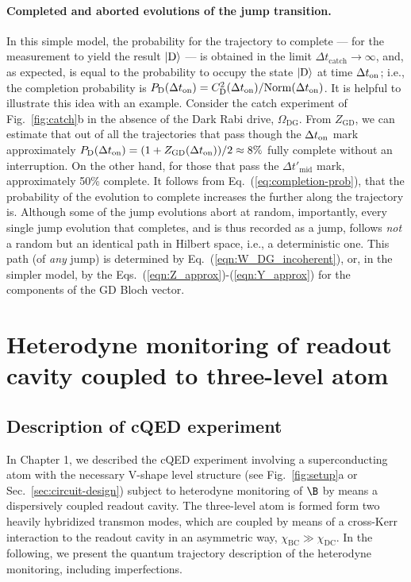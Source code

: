 \paragraph{Completed and aborted evolutions of the jump transition.}

In this simple model, the probability for the trajectory to complete
— for the measurement to yield the result $|{\rm D}\rangle$ — is
obtained in the limit $\Delta t_{\mathrm{catch}}\rightarrow\infty$,
and, as expected, is equal to the probability to occupy the state
$|{\rm D}\rangle$ at time $\Delta t_{{\rm on}}$; i.e., the completion
probability is $P_{\mathrm{D}}(\Delta t_{{\rm on}})=C_{{\rm D}}^{2}(\Delta t_{{\rm on}})/{{\rm Norm}(\Delta t_{{\rm on}})}$.
It is helpful to illustrate this idea with an example. Consider the
catch experiment of Fig.~\ref{fig:catch}b in the absence of the
Dark Rabi drive, $\Omega_{\mathrm{DG}}$. From $Z_{\mathrm{GD}}$,
we can estimate that out of all the trajectories that pass though
the $\Delta t_{{\rm on}}$ mark approximately $P_{\mathrm{D}}(\Delta t_{{\rm on}})=(1+Z_{\mathrm{GD}}(\Delta t_{{\rm on}}))/2\approx8\%$
fully complete without an interruption. On the other hand, for those
that pass the $\Delta t'_{\mathrm{mid}}$ mark, approximately 50\%
complete. It follows from Eq.~(\ref{eq:completion-prob}), that the
probability of the evolution to complete increases the further along
the trajectory is. Although some of the jump evolutions abort at random,
importantly, every single jump evolution that completes, and is thus
recorded as a jump, follows \textit{not} a random but an identical
path in Hilbert space, i.e., a deterministic one. This path (of \textit{any}
jump) is determined by Eq.~(\ref{eqn:W_DG_incoherent}), or, in the
simpler model, by the Eqs.~(\ref{eqn:Z_approx})-(\ref{eqn:Y_approx})
for the components of the GD Bloch vector.

\section{Heterodyne monitoring of readout cavity coupled to three-level atom\label{sec:Heterodyne-monitoring-of}}

\subsection{Description of cQED experiment \label{subsec:Description-of-cQED}}

In Chapter 1, we described the cQED experiment  involving a superconducting
atom with the necessary V-shape level structure (see Fig.~\ref{fig:setup}a
or Sec.~\ref{sec:circuit-design}) subject to heterodyne monitoring
of $\B$ by means a dispersively coupled readout cavity. The three-level
atom is formed form two heavily hybridized transmon modes, which are
coupled by means of a cross-Kerr interaction to the readout cavity
in an asymmetric way, $\chi_{\mathrm{BC}}\gg\chi_{\mathrm{DC}}$.
In the following, we present the quantum trajectory description of
the heterodyne monitoring, including imperfections.


